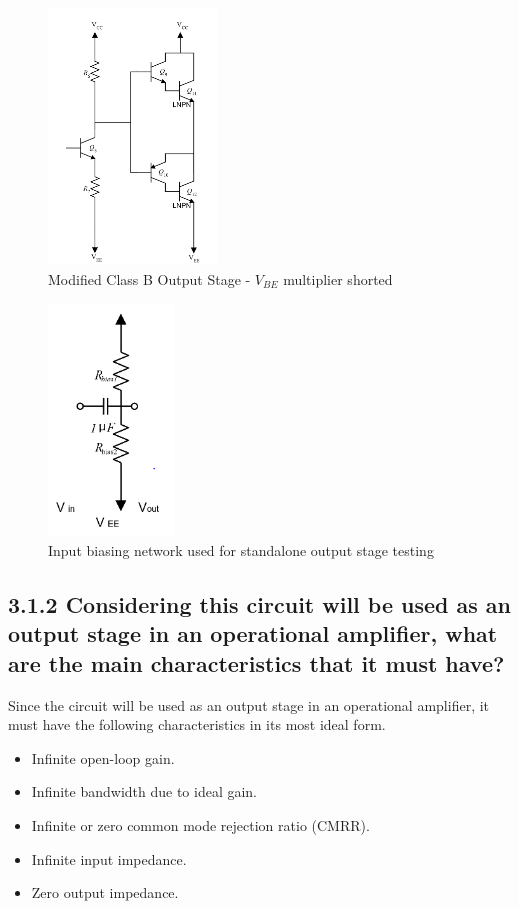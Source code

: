 \documentclass[12pt]{article}
\begin{document}
\begin{figure}[H]
\centering
\includegraphics[width=0.4\textwidth]{shorted.PNG}
\caption{Modified Class B Output Stage - $V_{BE}$ multiplier shorted}
\end{figure}

\begin{figure}[H]
\centering
\includegraphics[width=0.3\textwidth]{bias.PNG}
\caption{Input biasing network used for standalone output stage testing}
\end{figure}

\subsection*{3.1.2 Considering this circuit will be used as an output stage in an operational amplifier, what are the main characteristics that it must have?}

Since the circuit will be used as an output stage in an operational amplifier, it must have the following characteristics in its most ideal form.


\begin{itemize}
    \item Infinite open-loop gain.
    \item Infinite bandwidth due to ideal gain.
    \item Infinite or zero common mode rejection ratio (CMRR).
    \item Infinite input impedance.
    \item Zero output impedance.
\end{itemize}
\end{document}
